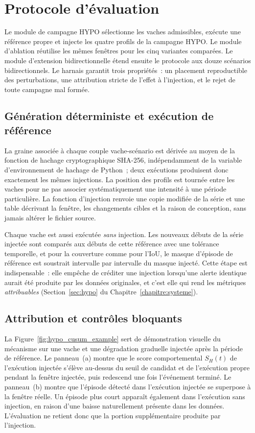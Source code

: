 \section{Protocole d'évaluation}
Le module de campagne HYPO sélectionne les vaches admissibles, exécute une
référence propre et injecte les quatre profils de la campagne HYPO. Le module
d'ablation réutilise les mêmes fenêtres pour les cinq variantes comparées. Le
module d'extension bidirectionnelle étend ensuite le protocole aux douze scénarios
bidirectionnels. Le harnais garantit trois propriétés~: un placement reproductible des
perturbations, une attribution stricte de l'effet à l'injection, et le rejet de toute
campagne mal formée.

\subsection{Génération déterministe et exécution de référence}
La graine associée à chaque couple vache-scénario est dérivée au moyen de la fonction de
hachage cryptographique SHA-256, indépendamment de la variable d'environnement de hachage
de Python~; deux exécutions produisent donc exactement les mêmes injections. La position des profils est tournée entre les vaches pour ne pas
associer systématiquement une intensité à une période particulière. La fonction
d'injection renvoie une copie modifiée de la série et une table décrivant la fenêtre, les
changements cibles et la raison de conception, sans jamais altérer le fichier source.

Chaque vache est aussi exécutée \emph{sans} injection. Les nouveaux débuts de la série
injectée sont comparés aux débuts de cette référence avec une tolérance temporelle, et pour
la couverture comme pour l'IoU, le masque d'épisode de référence est soustrait intervalle
par intervalle du masque injecté. Cette étape est indispensable~: elle empêche de créditer
une injection lorsqu'une alerte identique aurait été produite par les données originales, et
c'est elle qui rend les métriques \emph{attribuables} (Section~\ref{sec:hypo}
du Chapitre~\ref{chapitre:systeme}).

\subsection{Attribution et contrôles bloquants}
La Figure~\ref{fig:hypo_cusum_example} sert de démonstration visuelle du mécanisme sur une
vache et une dégradation graduelle injectée après la période de référence. Le panneau~(a) montre que
le score comportemental $S_H(t)$ de l'exécution injectée s'élève au-dessus du seuil de
candidat et de l'exécution propre pendant la fenêtre injectée, puis redescend une fois
l'événement terminé. Le panneau~(b) montre que l'épisode détecté dans l'exécution
injectée se superpose à la fenêtre réelle. Un épisode plus court apparaît également dans
l'exécution sans injection, en raison d'une baisse naturellement présente dans les données.
L'évaluation ne retient donc que la portion supplémentaire produite par l'injection.

